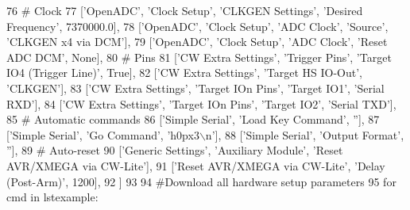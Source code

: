 \begin{DoxyCode}
76                       \textcolor{comment}{# Clock}
77                       [\textcolor{stringliteral}{'OpenADC'}, \textcolor{stringliteral}{'Clock Setup'}, \textcolor{stringliteral}{'CLKGEN Settings'}, \textcolor{stringliteral}{'Desired Frequency'}, 7370000.0],
78                       [\textcolor{stringliteral}{'OpenADC'}, \textcolor{stringliteral}{'Clock Setup'}, \textcolor{stringliteral}{'ADC Clock'}, \textcolor{stringliteral}{'Source'}, \textcolor{stringliteral}{'CLKGEN x4 via DCM'}],
79                       [\textcolor{stringliteral}{'OpenADC'}, \textcolor{stringliteral}{'Clock Setup'}, \textcolor{stringliteral}{'ADC Clock'}, \textcolor{stringliteral}{'Reset ADC DCM'}, \textcolor{keywordtype}{None}],
80                       \textcolor{comment}{# Pins}
81                       [\textcolor{stringliteral}{'CW Extra Settings'}, \textcolor{stringliteral}{'Trigger Pins'}, \textcolor{stringliteral}{'Target IO4 (Trigger Line)'}, \textcolor{keyword}{True}],
82                       [\textcolor{stringliteral}{'CW Extra Settings'}, \textcolor{stringliteral}{'Target HS IO-Out'}, \textcolor{stringliteral}{'CLKGEN'}],
83                       [\textcolor{stringliteral}{'CW Extra Settings'}, \textcolor{stringliteral}{'Target IOn Pins'}, \textcolor{stringliteral}{'Target IO1'}, \textcolor{stringliteral}{'Serial RXD'}],
84                       [\textcolor{stringliteral}{'CW Extra Settings'}, \textcolor{stringliteral}{'Target IOn Pins'}, \textcolor{stringliteral}{'Target IO2'}, \textcolor{stringliteral}{'Serial TXD'}],
85                       \textcolor{comment}{# Automatic commands}
86                       [\textcolor{stringliteral}{'Simple Serial'}, \textcolor{stringliteral}{'Load Key Command'}, \textcolor{stringliteral}{''}],
87                       [\textcolor{stringliteral}{'Simple Serial'}, \textcolor{stringliteral}{'Go Command'}, \textcolor{stringliteral}{'h0px3\(\backslash\)n'}],
88                       [\textcolor{stringliteral}{'Simple Serial'}, \textcolor{stringliteral}{'Output Format'}, \textcolor{stringliteral}{''}],
89                       \textcolor{comment}{# Auto-reset}
90                       [\textcolor{stringliteral}{'Generic Settings'}, \textcolor{stringliteral}{'Auxiliary Module'}, \textcolor{stringliteral}{'Reset AVR/XMEGA via CW-Lite'}],
91                       [\textcolor{stringliteral}{'Reset AVR/XMEGA via CW-Lite'}, \textcolor{stringliteral}{'Delay (Post-Arm)'}, 1200],
92                       ]
93         
94         \textcolor{comment}{#Download all hardware setup parameters}
95         \textcolor{keywordflow}{for} cmd \textcolor{keywordflow}{in} lstexample: 

\end{DoxyCode}
